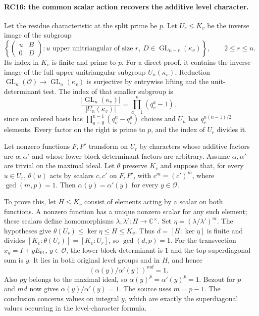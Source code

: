 \paragraph{RC16: the common scalar action recovers the additive level character.}
Let the residue characteristic at the split prime be $p$.
Let $U_r\le K_v$ be the inverse image of the subgroup
\[
 \left\{\begin{pmatrix}u&B\\0&D\end{pmatrix}:
 u\text{ upper unitriangular of size }r,\
 D\in\operatorname{GL}_{n-r}(\kappa_v)\right\},
 \qquad 2\le r\le n.
\]
Its index in $K_v$ is finite and prime to $p$.
For a direct proof, it contains the inverse image of the full upper
unitriangular subgroup $U_n(\kappa_v)$. Reduction
$\operatorname{GL}_n(\mathcal O)\to\operatorname{GL}_n(\kappa_v)$
is surjective by entrywise lifting and the unit-determinant test.
The index of that smaller subgroup is
\[
 \frac{|\operatorname{GL}_n(\kappa_v)|}{|U_n(\kappa_v)|}
       =\prod_{a=1}^{n}(q_v^a-1),                       \tag{RC.17}
\]
since an ordered basis has
$\prod_{a=0}^{n-1}(q_v^n-q_v^a)$ choices and $U_n$ has
$q_v^{n(n-1)/2}$ elements. Every factor on the right is prime to $p$,
and the index of $U_r$ divides it.

Let nonzero functions $F,F'$ transform on $U_r$ by characters whose
additive factors are $\alpha,\alpha'$ and whose lower-block determinant
factors are arbitrary. Assume $\alpha,\alpha'$ are trivial on the
maximal ideal. Let $\theta$ preserve $K_v$ and suppose that, for every
$u\in U_r$, $\theta(u)$ acts by scalars $c,c'$ on $F,F'$, with
$c^m=(c')^m$, where $\gcd(m,p)=1$.
Then $\alpha(y)=\alpha'(y)$ for every $y\in\mathcal O$.

To prove this, let $H\le K_v$ consist of elements acting by a scalar
on both functions. A nonzero function has a unique nonzero scalar
for any such element; these scalars define homomorphisms
$\lambda,\lambda':H\to\mathbb C^\times$.
Set $\eta=(\lambda/\lambda')^m$.
The hypotheses give $\theta(U_r)\le\ker\eta\le H\le K_v$.
Thus $d=[H:\ker\eta]$ is finite and divides
$[K_v:\theta(U_r)]=[K_v:U_r]$, so $\gcd(d,p)=1$.
For the transvection $x_y=I+yE_{01}$, $y\in\mathcal O$,
the lower-block determinant is $1$ and the top superdiagonal sum is $y$.
It lies in both original level groups and in $H$, and hence
\[
       (\alpha(y)/\alpha'(y))^{md}=1.
                                                               \tag{RC.18}
\]
Also $p y$ belongs to the maximal ideal, so
$\alpha(y)^p=\alpha'(y)^p=1$. Bezout for $p$ and $md$ now gives
$\alpha(y)/\alpha'(y)=1$. The source uses $m=p-1$.
The conclusion concerns values on integral $y$, which are exactly the
superdiagonal values occurring in the level-character formula.

